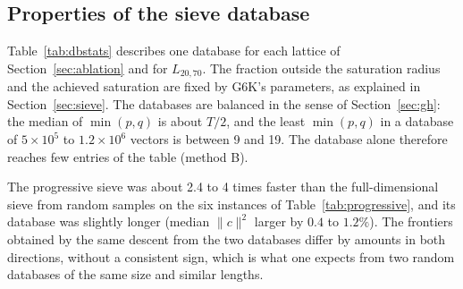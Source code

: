 \documentclass[11pt]{amsart}
\theoremstyle{definition}
\theoremstyle{remark}
\newcommand{\GH}{\mathrm{GH}}
\begin{document}
\subsection{Properties of the sieve database}\label{sec:dbstats}
Table~\ref{tab:dbstats} describes one database for each lattice of Section~\ref{sec:ablation}
and for $L_{20,70}$. The fraction outside the saturation radius and the
achieved saturation are fixed by G6K's parameters, as explained in Section~\ref{sec:sieve}.
The databases are balanced in the sense of Section~\ref{sec:gh}: the median of $\min(p,q)$ is
about $T/2$, and the least $\min(p,q)$ in a database of $5\times10^5$ to $1.2\times10^6$ vectors is
between 9 and 19. The database alone therefore reaches few entries of the table (method B).

The progressive sieve was about 2.4 to 4 times faster than the full-dimensional sieve from
random samples on the six instances of Table~\ref{tab:progressive}, and its database was
slightly longer (median $\|c\|^2$ larger by $0.4$ to $1.2\%$). The frontiers obtained by the same descent
from the two databases differ by amounts in both directions, without a consistent sign, which
is what one expects from two random databases of the same size and similar lengths.

\begin{table}[htbp]
\centering\footnotesize
\setlength{\tabcolsep}{4pt}

\caption{The sieve databases, one per lattice (the first seed). ``Out'': fraction of vectors
with $\|c\|^2>\rho\,\GH^2$; ``sat.'': number of vectors within the radius divided by
$\tfrac12\rho^{d/2}$ (G6K's target is $0.5$). $\GH$ uses the exact ball volume.}\label{tab:dbstats}
\end{table}

\begin{table}[htbp]
\centering\small

\caption{Progressive sieving against a full-dimensional sieve from random samples on
$L_{k,70}$, $\rho=1.45$, 16 cores. The last column is the total difference of the frontiers
(progressive minus random) over the entries $m\le16$ reached by both; it varies in sign.}
\label{tab:progressive}
\end{table}
\end{document}
